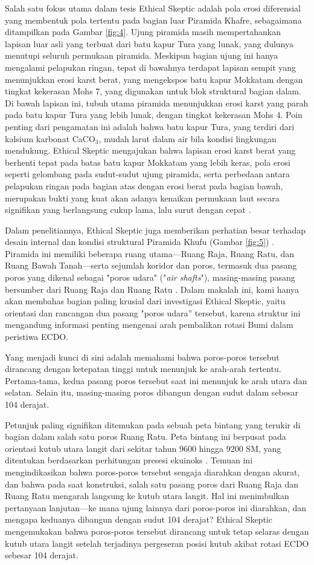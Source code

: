 \documentclass[10pt,twocolumn,letterpaper]{article}
\begin{document}
Salah satu fokus utama dalam tesis Ethical Skeptic adalah pola erosi diferensial yang membentuk pola tertentu pada bagian luar Piramida Khafre, sebagaimana ditampilkan pada Gambar \ref{fig:4}. Ujung piramida masih mempertahankan lapisan luar asli yang terbuat dari batu kapur Tura yang lunak, yang dulunya menutupi seluruh permukaan piramida. Meskipun bagian ujung ini hanya mengalami pelapukan ringan, tepat di bawahnya terdapat lapisan sempit yang menunjukkan erosi karst berat, yang mengekspos batu kapur Mokkatam dengan tingkat kekerasan Mohs 7, yang digunakan untuk blok struktural bagian dalam. Di bawah lapisan ini, tubuh utama piramida menunjukkan erosi karst yang parah pada batu kapur Tura yang lebih lunak, dengan tingkat kekerasan Mohs 4. Poin penting dari pengamatan ini adalah bahwa batu kapur Tura, yang terdiri dari kalsium karbonat CaCO$_3$, mudah larut dalam air bila kondisi lingkungan mendukung. Ethical Skeptic mengajukan bahwa lapisan erosi karst berat yang berhenti tepat pada batas batu kapur Mokkatam yang lebih keras, pola erosi seperti gelombang pada sudut-sudut ujung piramida, serta perbedaan antara pelapukan ringan pada bagian atas dengan erosi berat pada bagian bawah, merupakan bukti yang kuat akan adanya kenaikan permukaan laut secara signifikan yang berlangsung cukup lama, lalu surut dengan cepat \cite{27}.

Dalam penelitiannya, Ethical Skeptic juga memberikan perhatian besar terhadap desain internal dan kondisi struktural Piramida Khufu (Gambar \ref{fig:5}) \cite{28}. Piramida ini memiliki beberapa ruang utama—Ruang Raja, Ruang Ratu, dan Ruang Bawah Tanah—serta sejumlah koridor dan poros, termasuk dua pasang poros yang dikenal sebagai "poros udara" ("\textit{air shafts}"), masing-masing pasang bersumber dari Ruang Raja dan Ruang Ratu \cite{29,30}. Dalam makalah ini, kami hanya akan membahas bagian paling krusial dari investigasi Ethical Skeptic, yaitu orientasi dan rancangan dua pasang "poros udara” tersebut, karena struktur ini mengandung informasi penting mengenai arah pembalikan rotasi Bumi dalam peristiwa ECDO.

Yang menjadi kunci di sini adalah memahami bahwa poros-poros tersebut dirancang dengan ketepatan tinggi untuk menunjuk ke arah-arah tertentu. Pertama-tama, kedua pasang poros tersebut saat ini menunjuk ke arah utara dan selatan. Selain itu, masing-masing poros dibangun dengan sudut dalam sebesar 104 derajat.

Petunjuk paling signifikan ditemukan pada sebuah peta bintang yang terukir di bagian dalam salah satu poros Ruang Ratu. Peta bintang ini berpusat pada orientasi kutub utara langit dari sekitar tahun 9600 hingga 9200 SM, yang ditentukan berdasarkan perhitungan presesi ekuinoks \cite{28}. Temuan ini mengindikasikan bahwa poros-poros tersebut sengaja diarahkan dengan akurat, dan bahwa pada saat konstruksi, salah satu pasang poros dari Ruang Raja dan Ruang Ratu mengarah langsung ke kutub utara langit. Hal ini menimbulkan pertanyaan lanjutan—ke mana ujung lainnya dari poros-poros ini diarahkan, dan mengapa keduanya dibangun dengan sudut 104 derajat? Ethical Skeptic mengemukakan bahwa poros-poros tersebut dirancang untuk tetap selaras dengan kutub utara langit setelah terjadinya pergeseran posisi kutub akibat rotasi ECDO sebesar 104 derajat.
\end{document}
